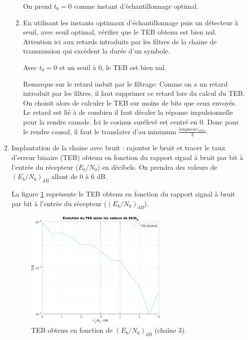 \documentclass[frenchb]{article}
\begin{document}
\begin{enumerate}
\begin{enumerate}
		         On prend $t_0 = 0$ comme instant d'échantillonnage optimal. 
		          
		         \par\leavevmode\par
                \item En utilisant les instants optimaux d'échantillonnage puis un détecteur à seuil, avec seuil optimal, vérifier que le TEB obtenu est bien nul. Attention ici aux retards introduits par les filtres de la chaine de transmission qui excèdent la durée d'un symbole.
                \par\leavevmode\par
       			 \setlength\parindent{0.5cm}
       			 Avec $t_0 = 0$ et un seuil à $0$, le TEB est bien nul. 
       			 
       			 Remarque sur le retard induit par le filtrage: Comme on a un retard introduit par les filtres, il faut supprimer ce retard lors du calcul du TEB. On choisit alors de calculer le TEB sur moins de bits que ceux envoyés. Le retard est lié à de combien il faut décaler la réponse impulsionnelle pour la rendre causale.
Ici le cosinus surélevé est centré en 0.
Donc pour le rendre causal, il faut le translater d'au minimum $\frac{longueur_{filtre}}{2}$.
       			 
       		     \par\leavevmode\par
            \end{enumerate}
        \item Implantation de la chaine avec bruit : rajouter le bruit et tracer le taux d'erreur binaire (TEB) obtenu en fonction du rapport signal à bruit par bit à l'entrée du récepteur ($E_b/N_0$) en décibels. On prendra des valeurs de $\left(E_b/N_0\right)_{dB}$ allant de $0$ à $6$ dB.
        \par\leavevmode\par
       	\setlength\parindent{0.5cm}
       	La figure \ref{fig : C3F6} représente le TEB obtenu en fonction du rapport signal à bruit par bit à l'entrée du récepteur  ($\left(E_b/N_0\right)_{dB}$). 
        
        \begin{figure}[ht!]
		\centering
		\includegraphics[width=7cm]{C3F6.png}		              	    \caption{TEB obtenu en fonction de $\left(E_b/N_0\right)_{dB}$ (chaîne 3). \label{fig : C3F6}}
		\end{figure}
		

\end{enumerate}
\end{document}
